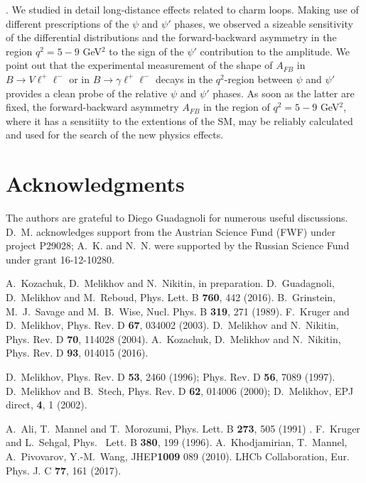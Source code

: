 \documentclass{PoS}
\begin{document}
\vspace{.2cm}
. We studied in detail long-distance effects related to charm loops. Making use of different prescriptions of the $\psi$ and $\psi'$ phases, we observed a 
sizeable sensitivity of the differential distributions and the forward-backward asymmetry in the region $q^2=5-9$ GeV$^2$ to the sign of the $\psi'$ 
contribution to the amplitude. We point out that the experimental measurement of the shape of $A_{FB}$ in $B\to V\ell^+\ell^-$ or in 
$B\to \gamma \ell^+\ell^-$ decays 
in the $q^2$-region between $\psi$ and $\psi'$ provides a clean probe of the relative $\psi$ and $\psi'$ phases. As soon as the latter are fixed, 
the forward-backward asymmetry $A_{FB}$ in the region of $q^2=5-9$ GeV$^2$, where it has a sensitiity to the extentions of the SM, may be reliably 
calculated and used for the search of the new physics effects. 

\section*{Acknowledgments}
\noindent
The authors are grateful to Diego Guadagnoli for numerous useful discussions. 
D.~M. acknowledges support from the Austrian Science Fund (FWF) under project P29028; 
A.~K. and N.~N. were supported by the Russian Science Fund under grant 16-12-10280. 
\begin{thebibliography}{99}
A.~Kozachuk, D.~Melikhov and N.~Nikitin, in preparation. 
D.~Guadagnoli, D.~Melikhov and M.~Reboud, Phys. Lett. B {\bf 760}, 442 (2016). 
B.~Grinstein, M.~J.~Savage and M.~B.~Wise, Nucl. Phys. B \textbf{319}, 271 (1989). 
F.~Kruger and D.~Melikhov, Phys. Rev. D {\bf 67}, 034002 (2003). 
D.~Melikhov and N.~Nikitin, Phys. Rev. D {\bf 70}, 114028 (2004).
A.~Kozachuk, D.~Melikhov and N.~Nikitin, Phys. Rev. D \textbf{93}, 014015 (2016). 
 
D.~Melikhov, Phys. Rev. D \textbf{53}, 2460 (1996); Phys. Rev. D \textbf{56}, 7089 (1997). 
D.~Melikhov and B.~Stech, Phys. Rev. D \textbf{62}, 014006 (2000); D.~Melikhov, EPJ direct, \textbf{4}, 1 (2002). 

A.~Ali, T.~Mannel and T.~Morozumi, Phys. Lett. B \textbf{273}, 505 (1991) . 
F.~Kruger and L.~Sehgal, Phys.~ Lett. B \textbf{380}, 199 (1996). 
A.~Khodjamirian, T.~Mannel, A.~Pivovarov, Y.-M.~Wang, JHEP\textbf{1009} 089 (2010). 
LHCb Collaboration, Eur. Phys. J. C \textbf{77}, 161 (2017). 

\end{thebibliography}
\end{document}
